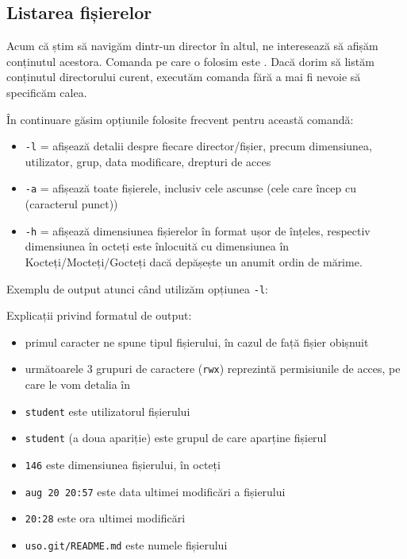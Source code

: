 \subsection{Listarea fișierelor}
\label{sec:file-system-file-list}

Acum că știm să navigăm dintr-un director în altul, ne interesează să afișăm
conținutul acestora. Comanda pe care o folosim este . Dacă dorim să listăm conținutul directorului curent, executăm comanda
 fără a mai fi nevoie să specificăm calea.

În continuare găsim opțiunile folosite frecvent pentru această comandă:

\begin{itemize}
	\item \texttt{-l} = afișează detalii despre fiecare director/fișier,
		precum dimensiunea, utilizator, grup, data modificare, drepturi
		de acces
	\item \texttt{-a} = afișează toate fișierele, inclusiv cele ascunse (cele
          care încep cu  (caracterul punct))
	\item \texttt{-h} = afișează dimensiunea fișierelor în format
		ușor de înțeles, respectiv dimensiunea în octeți este înlocuită
		cu dimensiunea în Kocteți/Mocteți/Gocteți dacă depășește un
		anumit ordin de mărime.
\end{itemize}

Exemplu de output atunci când utilizăm opțiunea \texttt{-l}:


Explicații privind formatul de output:

\begin{itemize}
	\item primul caracter ne spune tipul fișierului, în cazul de față fișier obișnuit
	\item următoarele 3 grupuri de caractere (\texttt{rwx}) reprezintă
		permisiunile de acces, pe care le vom detalia în
	\item \texttt{student} este utilizatorul fișierului
        \item \texttt{student} (a doua apariție) este grupul de care aparține fișierul
	\item \texttt{146} este dimensiunea fișierului, în octeți
	\item \texttt{aug 20 20:57} este data ultimei modificări a fișierului
	\item \texttt{20:28} este ora ultimei modificări
	\item \texttt{uso.git/README.md} este numele fișierului
\end{itemize}

